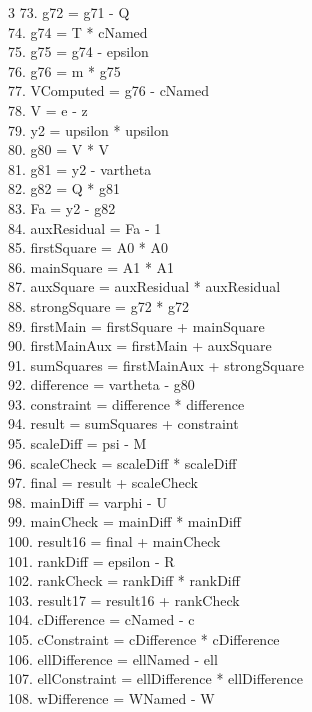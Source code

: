 \documentclass[10pt]{article}
\begin{document}
\begin{multicols}{3}
73. g72 = g71 - Q\\
74. g74 = T * cNamed\\
75. g75 = g74 - epsilon\\
76. g76 = m * g75\\
77. VComputed = g76 - cNamed\\
78. V = e - z\\
79. y2 = upsilon * upsilon\\
80. g80 = V * V\\
81. g81 = y2 - vartheta\\
82. g82 = Q * g81\\
83. Fa = y2 - g82\\
84. auxResidual = Fa - 1\\
85. firstSquare = A0 * A0\\
86. mainSquare = A1 * A1\\
87. auxSquare = auxResidual * auxResidual\\
88. strongSquare = g72 * g72\\
89. firstMain = firstSquare + mainSquare\\
90. firstMainAux = firstMain + auxSquare\\
91. sumSquares = firstMainAux + strongSquare\\
92. difference = vartheta - g80\\
93. constraint = difference * difference\\
94. result = sumSquares + constraint\\
95. scaleDiff = psi - M\\
96. scaleCheck = scaleDiff * scaleDiff\\
97. final = result + scaleCheck\\
98. mainDiff = varphi - U\\
99. mainCheck = mainDiff * mainDiff\\
100. result16 = final + mainCheck\\
101. rankDiff = epsilon - R\\
102. rankCheck = rankDiff * rankDiff\\
103. result17 = result16 + rankCheck\\
104. cDifference = cNamed - c\\
105. cConstraint = cDifference * cDifference\\
106. ellDifference = ellNamed - ell\\
107. ellConstraint = ellDifference * ellDifference\\
108. wDifference = WNamed - W\\

\end{multicols}
\end{document}
